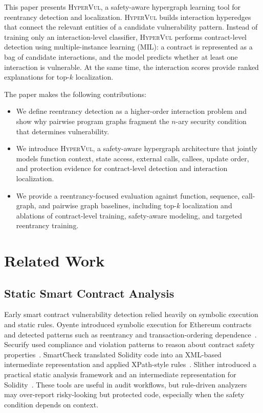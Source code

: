 \documentclass[conference]{IEEEtran}
\newcommand{\tool}{\textsc{HyperVul}}
\begin{document}
This paper presents \tool{}, a safety-aware hypergraph learning tool for reentrancy detection and localization. \tool{} builds interaction hyperedges that connect the relevant entities of a candidate vulnerability pattern. Instead of training only an interaction-level classifier, \tool{} performs contract-level detection using multiple-instance learning (MIL): a contract is represented as a bag of candidate interactions, and the model predicts whether at least one interaction is vulnerable. At the same time, the interaction scores provide ranked explanations for top-$k$ localization.

The paper makes the following contributions:
\begin{itemize}
    \item We define reentrancy detection as a higher-order interaction problem and show why pairwise program graphs fragment the $n$-ary security condition that determines vulnerability.
    \item We introduce \tool{}, a safety-aware hypergraph architecture that jointly models function context, state access, external calls, callees, update order, and protection evidence for contract-level detection and interaction localization.
    \item We provide a reentrancy-focused evaluation against function, sequence, call-graph, and pairwise graph baselines, including top-$k$ localization and ablations of contract-level training, safety-aware modeling, and targeted reentrancy training.
\end{itemize}

\section{Related Work}

\subsection{Static Smart Contract Analysis}
Early smart contract vulnerability detection relied heavily on symbolic execution and static rules. Oyente introduced symbolic execution for Ethereum contracts and detected patterns such as reentrancy and transaction-ordering dependence~\cite{luu2016oyente}. Securify used compliance and violation patterns to reason about contract safety properties~\cite{tsankov2018securify}. SmartCheck translated Solidity code into an XML-based intermediate representation and applied XPath-style rules~\cite{tikhomirov2018smartcheck}. Slither introduced a practical static analysis framework and an intermediate representation for Solidity~\cite{feist2019slither}. These tools are useful in audit workflows, but rule-driven analyzers may over-report risky-looking but protected code, especially when the safety condition depends on context.
\end{document}
